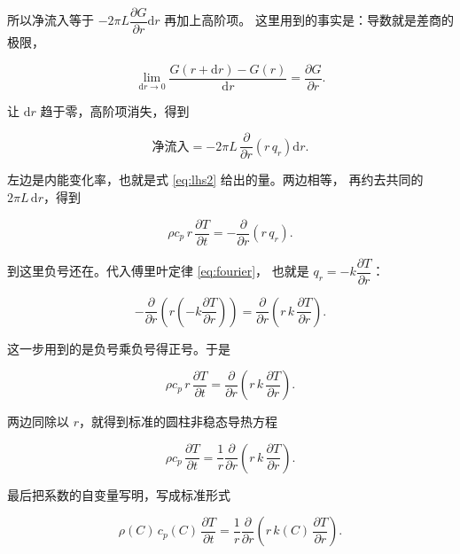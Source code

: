 所以净流入等于 $-2\pi L\dfrac{\partial G}{\partial r}\mathrm{d}r$ 再加上高阶项。
这里用到的事实是：导数就是差商的极限，

\begin{equation}
\lim_{\mathrm{d}r\to0}\frac{G(r+\mathrm{d}r)-G(r)}{\mathrm{d}r}
= \frac{\partial G}{\partial r}.
\end{equation}

让 $\mathrm{d}r$ 趋于零，高阶项消失，得到

\begin{equation}
\text{净流入} = -2\pi L\,\frac{\partial}{\partial r}\left(r\,q_r\right)\mathrm{d}r .
\label{eq:rhs2}
\end{equation}

左边是内能变化率，也就是式 \eqref{eq:lhs2} 给出的量。两边相等，
再约去共同的 $2\pi L\,\mathrm{d}r$，得到

\begin{equation}
\rho c_p\,r\,\frac{\partial T}{\partial t}
= -\frac{\partial}{\partial r}\left(r\,q_r\right).
\label{eq:balance2}
\end{equation}

到这里负号还在。代入傅里叶定律 \eqref{eq:fourier}，
也就是 $q_r=-k\dfrac{\partial T}{\partial r}$：

\begin{equation}
-\frac{\partial}{\partial r}\left(r\left(-k\frac{\partial T}{\partial r}\right)\right)
= \frac{\partial}{\partial r}\left(r\,k\,\frac{\partial T}{\partial r}\right).
\end{equation}

这一步用到的是负号乘负号得正号。于是

\begin{equation}
\rho c_p\,r\,\frac{\partial T}{\partial t}
= \frac{\partial}{\partial r}\left(r\,k\,\frac{\partial T}{\partial r}\right).
\end{equation}

两边同除以 $r$，就得到标准的圆柱非稳态导热方程

\begin{equation}
\rho c_p\,\frac{\partial T}{\partial t}
= \frac{1}{r}\frac{\partial}{\partial r}\left(r\,k\,\frac{\partial T}{\partial r}\right).
\end{equation}

最后把系数的自变量写明，写成标准形式

\begin{equation}
\boxed{\;
\rho(C)\,c_p(C)\,\frac{\partial T}{\partial t}
= \frac{1}{r}\frac{\partial}{\partial r}\left(r\,k(C)\,\frac{\partial T}{\partial r}\right).
\;}
\label{eq:energy}
\end{equation}


